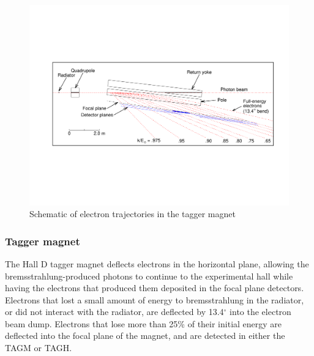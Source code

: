 \begin{figure}[tbp]
\begin{center}
   \includegraphics[width=0.95\linewidth,viewport=80 200 750 400]{figures/BEAM_taggerplot.pdf}
\caption{Schematic of electron trajectories in the tagger magnet 
       \label{fig:beam:BEAM_taggerplot}  }
\end{center}
\end{figure}


\subsubsection{Tagger magnet \label{sec:tagMagnet}}
The Hall D tagger magnet deflects electrons in the horizontal plane, allowing the bremsstrahlung-produced photons to continue to the experimental hall while having the electrons that produced them deposited in the focal plane detectors.
Electrons that lost a small amount of energy to bremsstrahlung in the
radiator, or did not interact with the radiator, are deflected by 13.4$^\circ$ into the electron beam dump.
Electrons that lose more than 25\% of their initial energy are deflected into the focal plane of the magnet, and are detected in either the TAGM or TAGH.

